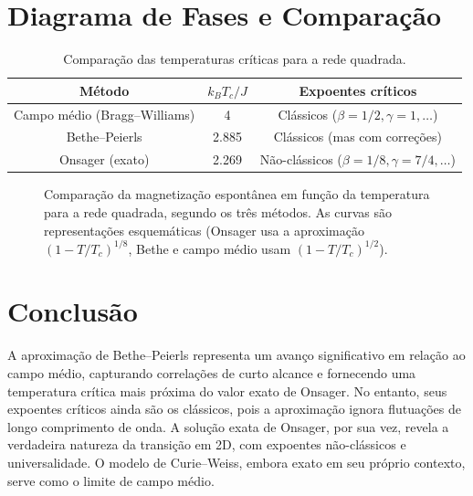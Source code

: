 \documentclass[12pt]{article}
\begin{document}
\section{Diagrama de Fases e Comparação}

\begin{table}[h]
\centering
\begin{tabular}{|c|c|c|}
\hline
Método & \(k_B T_c / J\) & Expoentes críticos \\
\hline
Campo médio (Bragg–Williams) & 4 & Clássicos (\(\beta=1/2, \gamma=1, \dots\)) \\
Bethe–Peierls & 2.885 & Clássicos (mas com correções) \\
Onsager (exato) & 2.269 & Não-clássicos (\(\beta=1/8, \gamma=7/4, \dots\)) \\
\hline
\end{tabular}
\caption{Comparação das temperaturas críticas para a rede quadrada.}
\end{table}

\begin{figure}[h]
\centering
{}
\caption{Comparação da magnetização espontânea em função da temperatura para a rede quadrada, segundo os três métodos. As curvas são representações esquemáticas (Onsager usa a aproximação \((1-T/T_c)^{1/8}\), Bethe e campo médio usam \((1-T/T_c)^{1/2}\)).}
\end{figure}

\section{Conclusão}

A aproximação de Bethe–Peierls representa um avanço significativo em relação ao campo médio, capturando correlações de curto alcance e fornecendo uma temperatura crítica mais próxima do valor exato de Onsager. No entanto, seus expoentes críticos ainda são os clássicos, pois a aproximação ignora flutuações de longo comprimento de onda. A solução exata de Onsager, por sua vez, revela a verdadeira natureza da transição em 2D, com expoentes não-clássicos e universalidade. O modelo de Curie–Weiss, embora exato em seu próprio contexto, serve como o limite de campo médio.
\end{document}
